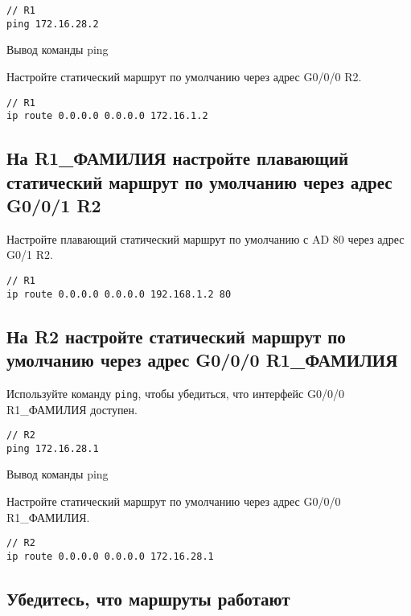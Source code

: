 \begin{verbatim}
// R1
ping 172.16.28.2
\end{verbatim}

\begin{image}
    \caption{Вывод команды ping}
\end{image}

Настройте статический маршрут по умолчанию через адрес G0/0/0 R2.

\begin{verbatim}
// R1
ip route 0.0.0.0 0.0.0.0 172.16.1.2
\end{verbatim}

\subsection{На R1\_ФАМИЛИЯ настройте плавающий статический маршрут
по умолчанию через адрес G0/0/1 R2}

Настройте плавающий статический маршрут по умолчанию с AD 80 через адрес G0/1 R2.

\begin{verbatim}
// R1
ip route 0.0.0.0 0.0.0.0 192.168.1.2 80
\end{verbatim}

\subsection{На R2 настройте статический маршрут по умолчанию
через адрес G0/0/0 R1\_ФАМИЛИЯ}

Используйте команду \texttt{ping}, чтобы убедиться,
что интерфейс G0/0/0 R1\_ФАМИЛИЯ доступен.

\begin{verbatim}
// R2
ping 172.16.28.1
\end{verbatim}

\begin{image}
    \caption{Вывод команды ping}
\end{image}

Настройте статический маршрут по умолчанию через адрес G0/0/0 R1\_ФАМИЛИЯ.

\begin{verbatim}
// R2
ip route 0.0.0.0 0.0.0.0 172.16.28.1
\end{verbatim}

\subsection{Убедитесь, что маршруты работают}

